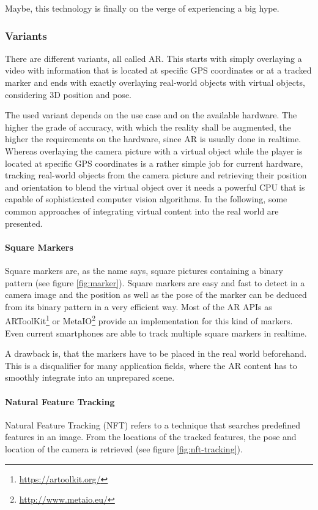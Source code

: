 Maybe, this technology is finally on the verge of experiencing a big hype.

\subsubsection{Variants}
There are different variants, all called AR. This starts with simply overlaying a video with information that is located at specific GPS coordinates or at a tracked marker and ends with exactly overlaying real-world objects with virtual objects, considering 3D position and pose.

The used variant depends on the use case and on the available hardware. The higher the grade of accuracy, with which the reality shall be augmented, the higher the requirements on the hardware, since AR is usually done in realtime. Whereas overlaying the camera picture with a virtual object while the player is located at specific GPS coordinates is a rather simple job for current hardware, tracking real-world objects from the camera picture and retrieving their position and orientation to blend the virtual object over it needs a powerful CPU that is capable of sophisticated computer vision algorithms. In the following, some common approaches of integrating virtual content into the real world are presented.

\paragraph{Square Markers}
Square markers are, as the name says, square pictures containing a binary pattern (see figure \ref{fig:marker}). Square markers are easy and fast to detect in a camera image and the position as well as the pose of the marker can be deduced from its binary pattern in a very efficient way. Most of the AR APIs as ARToolKit\footnote{\url{https://artoolkit.org/}} or MetaIO\footnote{\url{http://www.metaio.eu/}} provide an implementation for this kind of markers. Even current smartphones are able to track multiple square markers in realtime.

A drawback is, that the markers have to be placed in the real world beforehand. This is a disqualifier for many application fields, where the AR content has to smoothly integrate into an unprepared scene.

\paragraph{Natural Feature Tracking}
Natural Feature Tracking (NFT) refers to a technique that searches predefined features in an image. From the locations of the tracked features, the pose and location of the camera is retrieved \citep{neumann1999natural} (see figure \ref{fig:nft-tracking}).

